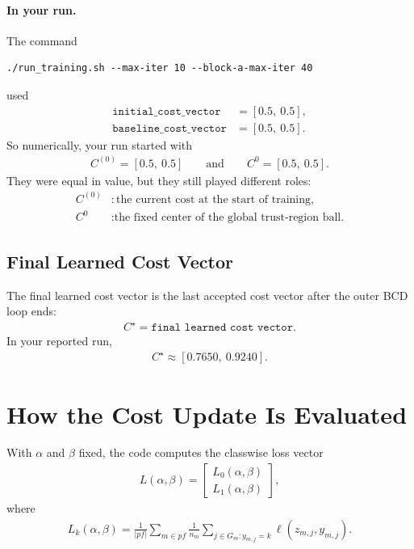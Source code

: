 \documentclass[11pt]{article}
\begin{document}
\paragraph{In your run.}
The command
\begin{verbatim}
./run_training.sh --max-iter 10 --block-a-max-iter 40
\end{verbatim}
used
\begin{align}
\texttt{initial\_cost\_vector} &= [0.5,\ 0.5], \\
\texttt{baseline\_cost\_vector} &= [0.5,\ 0.5].
\end{align}
So numerically, your run started with
\begin{align}
C^{(0)} = [0.5,\ 0.5]
\qquad \text{and} \qquad
C^0 = [0.5,\ 0.5].
\end{align}
They were equal in value, but they still played different roles:
\begin{align*}
C^{(0)} &: \text{the current cost at the start of training}, \\
C^0 &: \text{the fixed center of the global trust-region ball.}
\end{align*}

\subsection{Final Learned Cost Vector}
The final learned cost vector is the last accepted cost vector after the outer
BCD loop ends:
\begin{align}
C^{\star} = \texttt{final learned cost vector}.
\end{align}
In your reported run,
\begin{align}
C^\star \approx [0.7650,\ 0.9240].
\end{align}

\section{How the Cost Update Is Evaluated}
With $\alpha$ and $\beta$ fixed, the code computes the classwise loss vector
\begin{align}
L(\alpha,\beta)
=
\begin{bmatrix}
L_0(\alpha,\beta) \\
L_1(\alpha,\beta)
\end{bmatrix},
\end{align}
where
\begin{align}
L_k(\alpha,\beta)
=
\frac{1}{|pf|}
\sum_{m \in pf}
\frac{1}{n_m}
\sum_{j \in G_m : y_{m,j} = k}
\ell(z_{m,j}, y_{m,j}).
\end{align}
\end{document}

